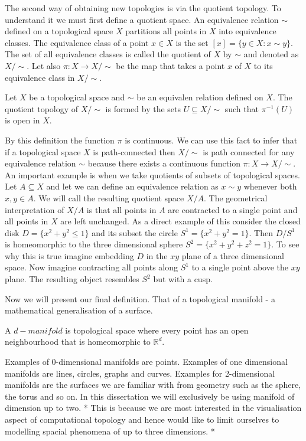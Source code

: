 The second way of obtaining new topologies is via the quotient topology. To understand it we must first define a quotient space. An equivalence relation $\sim$ defined on a topological space $X$ partitions all points in $X$ into equivalence classes. The equivalence class of a point $x \in X$ is the set $[x] = \{y \in X: x \sim y\}$. The set of all equivalence classes is called the quotient of $X$ by $\sim$ and denoted as $X / \sim$. Let also $\pi: X \to X/ \sim$ be the map that takes a point $x$ of $X$ to its equivalence class in $X / \sim$.

\begin{defn} Let $X$ be a topological space and $\sim$ be an equivalen relation defined on $X$. The quotient topology of $X / \sim$ is formed by the sets $U \subseteq X / \sim$ such that $\pi^{-1}(U)$ is open in $X$. \end{defn}

By this definition the function $\pi$ is continuous. We can use this fact to infer that if a topological space $X$ is path-connected then $X / \sim$ is path connected for any equivalence relation $\sim$ because there exists a continuous function $\pi : X \to X / \sim$. An important example is when we take quotients of subsets of topological spaces. Let $A \subseteq X$ and let we can define an equivalence relation as $x \sim y$ whenever both $x, y \in A$. We will call the resulting quotient space $X / A$. The geometrical interpretation of $X / A$ is that all points in $A$ are contracted to a single point and all points in $X$ are left unchanged. As a direct example of this consider the closed disk $D = \{x^2 + y^2 \le 1\}$ and its subset the circle $S^1 = \{x^2 + y^2 = 1\}$.
Then $D / S^1$ is homeomorphic to the three dimensional sphere $S^2 = \{x^2 + y^2 + z^2 = 1\}$. To see why this is true imagine embedding $D$ in the $xy$ plane of a three dimensional space. Now imagine contracting all points along $S^1$ to a single point above the $xy$ plane. The resulting object resembles $S^2$ but with a cusp.

Now we will present our final definition. That of a topological manifold - a mathematical generalisation of a surface.

\begin{defn} A $d-manifold$ is topological space where every point has an open neighbourhood that is homeomorphic to $\mathbb{R}^d$.  \end{defn}

Examples of 0-dimensional manifolds are points. Examples of one dimensional manifolds are lines, circles, graphs and curves. Examples for 2-dimensional manifolds are the surfaces we are familiar with from geometry such as the sphere, the torus and so on. In this dissertation we will exclusively be using manifold of dimension up to two. * This is because we are most interested in the visualisation aspect of computational topology and hence would like to limit ourselves to modelling spacial phenomena of up to three dimensions. *


